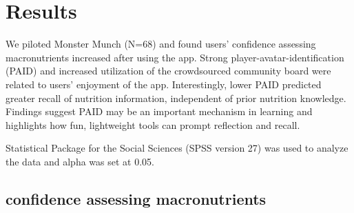 \section{Results}
We piloted Monster Munch (N=68) and found users' confidence assessing macronutrients increased after using the app. Strong player-avatar-identification (PAID) and increased utilization of the crowdsourced community board were related to users' enjoyment of the app. Interestingly, lower PAID predicted greater recall of nutrition information, independent of prior nutrition knowledge. Findings suggest PAID may be an important mechanism in learning and highlights how fun, lightweight tools can prompt reflection and recall.





Statistical Package for the Social Sciences (SPSS version 27) was used to analyze the data and alpha was set at 0.05. 




\subsection{confidence assessing macronutrients}

